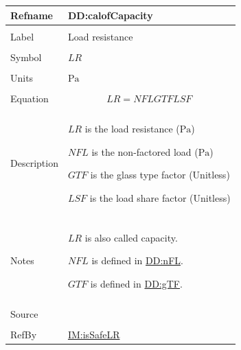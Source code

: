 \documentclass[12pt]{article}
\begin{document}
\vspace{\baselineskip}
\noindent
\begin{minipage}{\textwidth}
\begin{tabular}{>{\raggedright}p{}>{\raggedright\arraybackslash}p{}}
\toprule \textbf{Refname} & \textbf{DD:calofCapacity}
\label{DD:calofCapacity}
\\ \midrule \\
Label & Load resistance
        
\\ \midrule \\
Symbol & $\mathit{LR}$
         
\\ \midrule \\
Units & ${\text{Pa}}$
        
\\ \midrule \\
Equation & \begin{displaymath}
           \mathit{LR}=\mathit{NFL} \mathit{GTF} \mathit{LSF}
           \end{displaymath}
\\ \midrule \\
Description & \begin{symbDescription}
              \item{$\mathit{LR}$ is the load resistance (${\text{Pa}}$)}
              \item{$\mathit{NFL}$ is the non-factored load (${\text{Pa}}$)}
              \item{$\mathit{GTF}$ is the glass type factor (Unitless)}
              \item{$\mathit{LSF}$ is the load share factor (Unitless)}
              \end{symbDescription}
\\ \midrule \\
Notes & $\mathit{LR}$ is also called capacity.
        
        $\mathit{NFL}$ is defined in \hyperref[DD:nFL]{DD:nFL}.
        
        $\mathit{GTF}$ is defined in \hyperref[DD:gTF]{DD:gTF}.
        
\\ \midrule \\
Source & \cite{astm2009}
         
\\ \midrule \\
RefBy & \hyperref[IM:isSafeLR]{IM:isSafeLR}
        
\\ \bottomrule
\end{tabular}
\end{minipage}
\end{document}
